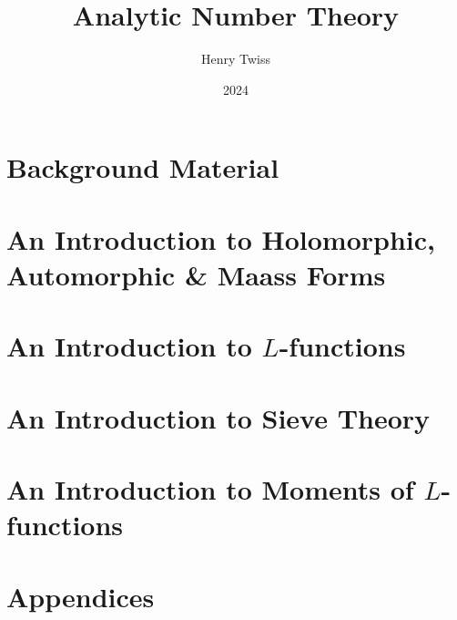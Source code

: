 \documentclass[12pt,oneside]{book}
\title{Analytic Number Theory}
\author{Henry Twiss}
\date{2024}
\begin{document}
\maketitle
\pagestyle{empty}
\tableofcontents
\setcounter{page}{0}
\pagestyle{fancy}

\part{Background Material}
  

\part{An Introduction to Holomorphic, Automorphic \& Maass Forms}
  
  
  
  

\part{An Introduction to \texorpdfstring{$L$}{L}-functions}
  
  
  

\part{An Introduction to Sieve Theory}
  
  

\part{An Introduction to Moments of \texorpdfstring{$L$}{L}-functions}
  

\part{Appendices}
  

\printindex


\end{document}
